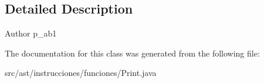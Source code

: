 \subsection{Detailed Description}
\begin{DoxyAuthor}{Author}
p\+\_\+ab1 
\end{DoxyAuthor}


The documentation for this class was generated from the following file\+:\begin{DoxyCompactItemize}
\item 
src/ast/instrucciones/funciones/Print.\+java\end{DoxyCompactItemize}
